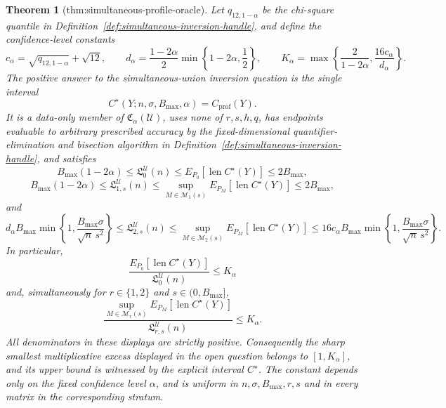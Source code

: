 \documentclass{article}
\newtheorem{theorem}{Theorem}
\begin{document}
\begin{theorem}[thm:simultaneous-profile-oracle]\label{thm:simultaneous-profile-oracle}
Let \(q_{12,1-\alpha}\) be the chi-square quantile in Definition~\ref{def:simultaneous-inversion-handle}, and define the confidence-level constants
\[
 c_\alpha=\sqrt{q_{12,1-\alpha}}+\sqrt{12},\qquad
 d_\alpha=\frac{1-2\alpha}{2}\min\left\{1-2\alpha,\frac12\right\},
 \qquad
 K_\alpha=\max\left\{\frac{2}{1-2\alpha},\frac{16c_\alpha}{d_\alpha}\right\}.
\]
The positive answer to the simultaneous-union inversion question is the single interval
\[
 C^\star(Y;n,\sigma,B_{\max},\alpha)=C_{\mathrm{prof}}(Y).
\]
It is a data-only member of \(\mathfrak C_\alpha(\mathcal U)\), uses none of \(r,s,h,q\), has endpoints evaluable to arbitrary prescribed accuracy by the fixed-dimensional quantifier-elimination and bisection algorithm in Definition~\ref{def:simultaneous-inversion-handle}, and satisfies
\[
 B_{\max}(1-2\alpha)\leq\mathfrak L_0^{\mathcal U}(n)
 \leq E_{P_0}[\operatorname{len}C^\star(Y)]\leq2B_{\max},
\]
\[
 B_{\max}(1-2\alpha)\leq\mathfrak L_{1,s}^{\mathcal U}(n)
 \leq\sup_{M\in\mathcal M_1(s)}E_{P_M}[\operatorname{len}C^\star(Y)]
 \leq2B_{\max},
\]
and
\[
 d_\alpha B_{\max}\min\left\{1,\frac{B_{\max}\sigma}{\sqrt n\,s^2}\right\}
 \leq\mathfrak L_{2,s}^{\mathcal U}(n)
 \leq\sup_{M\in\mathcal M_2(s)}E_{P_M}[\operatorname{len}C^\star(Y)]
 \leq16c_\alpha B_{\max}\min\left\{1,\frac{B_{\max}\sigma}{\sqrt n\,s^2}\right\}.
\]
In particular,
\[
 \frac{E_{P_0}[\operatorname{len}C^\star(Y)]}{\mathfrak L_0^{\mathcal U}(n)}\leq K_\alpha
\]
and, simultaneously for \(r\in\{1,2\}\) and \(s\in(0,B_{\max}]\),
\[
 \frac{\sup_{M\in\mathcal M_r(s)}E_{P_M}[\operatorname{len}C^\star(Y)]}
 {\mathfrak L_{r,s}^{\mathcal U}(n)}\leq K_\alpha.
\]
All denominators in these displays are strictly positive.  Consequently the sharp smallest multiplicative excess displayed in the open question belongs to \([1,K_\alpha]\), and its upper bound is witnessed by the explicit interval \(C^\star\).  The constant depends only on the fixed confidence level \(\alpha\), and is uniform in \(n,\sigma,B_{\max},r,s\) and in every matrix in the corresponding stratum.
\end{theorem}
\end{document}
